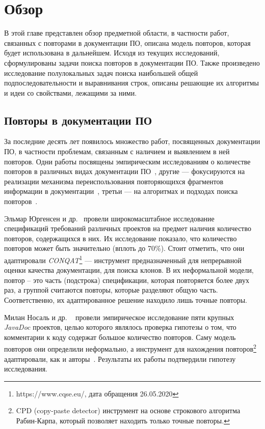 \section{Обзор}
В этой главе представлен обзор предметной области, в частности работ, связанных с повторами в документации ПО, описана модель повторов, которая будет использована в дальнейшем. 
Исходя из текущих исследований, сформулированы задачи поиска повторов в документации ПО.
Также произведено исследование полулокальных задач поиска наибольшей общей подпоследовательности и выравнивания строк, описаны решающие их алгоритмы и идеи со свойствами, лежащими за ними.

\subsection{Повторы в документации ПО}\label{duplicateReport}

За последние десять лет появилось множество работ, посвященных документации ПО, в частности проблемам, связанным с наличием и выявлением в ней повторов.
Одни работы посвящены эмпирическим исследованиям о количестве повторов  в различных видах документации ПО~\cite{poruban2016preliminary,juergens2010can,oumaziz2017documentation}, другие --- фокусируются на реализации механизма переиспользования повторяющихся фрагментов информации в документации~\cite{koznov2015clone,horie2010tool,poruban2014reusable}, третьи --- на алгоритмах и подходах поиска повторов~\cite{luciv2018detecting,luciv2019interactive,blasi2018replicomment,rago2016identifying, soto2015similarity}.

Эльмар Юргенсен и др.~\cite{juergens2010can} провели широкомасштабное исследование спецификаций требований различных проектов на предмет наличия количество повторов, содержащихся в них. 
Их исследование показало, что количество повторов может быть значительно (вплоть до 70\%). 
Стоит отметить, что они адаптировали \emph{CONQAT}\footnote{https://www.cqse.eu/, дата обращения 26.05.2020} --- инструмент предназначенный для непрерывной оценки качества документации, для поиска клонов.
В их неформальной модели, повтор -- это часть (подстрока) спецификации, которая повторяется более двух раз, а группой считаются повторы, которые разделяют общую часть. 
Соответственно, их адаптированное решение находило лишь точные повторы.

Милан Носаль и др. ~\cite{poruban2016preliminary} провели эмпирическое исследование пяти крупных \emph{JavaDoc} проектов, целью которого являлось проверка гипотезы о том, что комментарии к коду содержат большое количество повторов.
Саму модель повторов они определили неформально, а инструмент для нахождения повторов\footnote{CPD (copy-paste detector) инструмент на основе строкового алгоритма Рабин-Карпа, который позволяет находить только точные повторы.} адаптировали, как и авторы~\cite{juergens2010can}.
Результаты их работы подтвердили гипотезу исследования. 


